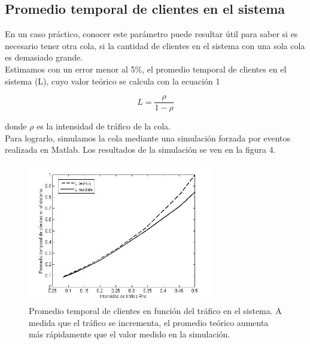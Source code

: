\documentclass[10pt,journal,compsoc]{IEEEtran}
\begin{document}
\subsection{Promedio temporal de clientes en el sistema} %
En un caso pr\'actico, conocer este par\'ametro puede resultar \'util para saber si es necesario
tener otra cola, si la cantidad de clientes en el sistema con una sola cola es demasiado grande.\\
Estimamos con un error menor al 5\%, el promedio temporal de clientes en el sistema (L), 
cuyo valor te\'orico se calcula con la ecuaci\'on 1

\begin{equation}
L = \frac{\rho}{1-\rho}
\end{equation}

donde $\rho$ es la intensidad de tr\'afico de la cola.\\
Para lograrlo, simulamos la cola mediante una simulaci\'on forzada por eventos realizada en Matlab.
Los resultados de la simulaci\'on se ven en la figura 4.

\begin{figure}[t]%
\label{fig:puntouno}
\begin{center}
\centering
\includegraphics[width=3.2in]{L_rho}
\caption{Promedio temporal de clientes en funci\'on del tr\'afico en el sistema. A medida que el tr\'afico se incrementa, el promedio te\'orico aumenta m\'as r\'apidamente que el valor medido en la simulaci\'on.}
\end{center}
\end{figure}

\end{document}
